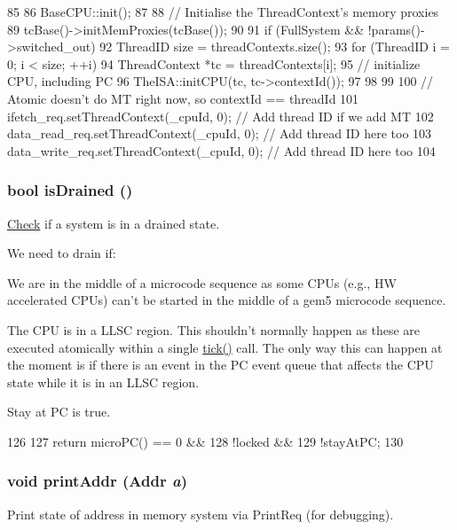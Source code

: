 \begin{DoxyCode}
85 {
86     BaseCPU::init();
87 
88     // Initialise the ThreadContext's memory proxies
89     tcBase()->initMemProxies(tcBase());
90 
91     if (FullSystem && !params()->switched_out) {
92         ThreadID size = threadContexts.size();
93         for (ThreadID i = 0; i < size; ++i) {
94             ThreadContext *tc = threadContexts[i];
95             // initialize CPU, including PC
96             TheISA::initCPU(tc, tc->contextId());
97         }
98     }
99 
100     // Atomic doesn't do MT right now, so contextId == threadId
101     ifetch_req.setThreadContext(_cpuId, 0); // Add thread ID if we add MT
102     data_read_req.setThreadContext(_cpuId, 0); // Add thread ID here too
103     data_write_req.setThreadContext(_cpuId, 0); // Add thread ID here too
104 }
\end{DoxyCode}
\hypertarget{classAtomicSimpleCPU_ac166e5bc3ddf730beb1282cf821096ae}{
\subsubsection[{isDrained}]{\setlength{\rightskip}{0pt plus 5cm}bool isDrained ()}}
\label{classAtomicSimpleCPU_ac166e5bc3ddf730beb1282cf821096ae}
\hyperlink{classCheck}{Check} if a system is in a drained state.

We need to drain if: 
\begin{DoxyItemize}
\item We are in the middle of a microcode sequence as some CPUs (e.g., HW accelerated CPUs) can't be started in the middle of a gem5 microcode sequence.


\item The CPU is in a LLSC region. This shouldn't normally happen as these are executed atomically within a single \hyperlink{classAtomicSimpleCPU_a873dd91783f9efb4a590aded1f70d6b0}{tick()} call. The only way this can happen at the moment is if there is an event in the PC event queue that affects the CPU state while it is in an LLSC region.


\item Stay at PC is true. 
\end{DoxyItemize}


\begin{DoxyCode}
126                      {
127         return microPC() == 0 &&
128             !locked &&
129             !stayAtPC;
130     }
\end{DoxyCode}
\hypertarget{classAtomicSimpleCPU_a88aa41e2693dd0091afae2604eba9bed}{
\subsubsection[{printAddr}]{\setlength{\rightskip}{0pt plus 5cm}void printAddr ({\bf Addr} {\em a})}}
\label{classAtomicSimpleCPU_a88aa41e2693dd0091afae2604eba9bed}
Print state of address in memory system via PrintReq (for debugging). 


